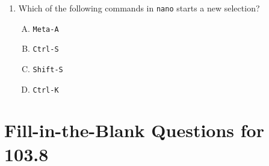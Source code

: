 \documentclass[a4paper]{report}
\begin{document}
\begin{enumerate}[1.]
    \item Which of the following commands in \texttt{nano} starts a new selection?  
    \begin{enumerate}[A)]
        \item \texttt{Meta-A}  
        \item \texttt{Ctrl-S}  
        \item \texttt{Shift-S}  
        \item \texttt{Ctrl-K}  
    \end{enumerate}

\end{enumerate}


\newpage
\section*{Fill-in-the-Blank Questions for 103.8}
\end{document}
